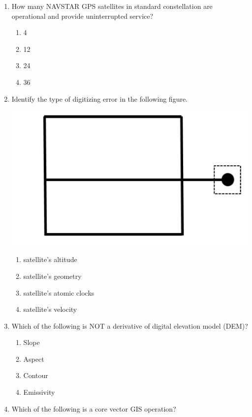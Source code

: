 \documentclass[12pt]{article}
\begin{document}
\begin{enumerate}
\item How many NAVSTAR GPS satellites in standard constellation are operational
and provide uninterrupted service?
\begin{enumerate}
   \item 4 
   \item 12 
   \item 24 
   \item 36
\end{enumerate}

\item Identify the type of digitizing error in the following figure.

\includegraphics[scale = 0.8]{Figs/LatexImage3.png} 
\begin{enumerate}
     
   \item satellite’s altitude 
   \item satellite’s geometry  
   \item satellite’s atomic clocks 
   \item satellite’s velocity
\end{enumerate}

\item Which of the following is NOT a derivative of digital elevation model (DEM)?

\begin{enumerate}
    \item Slope 
   \item Aspect 
   \item Contour 
   \item Emissivity 
\end{enumerate}

\item Which of the following is a core vector GIS operation?


\end{enumerate}
\end{document}
